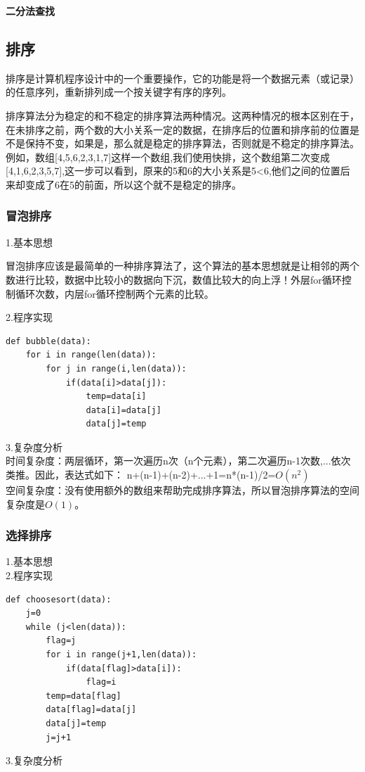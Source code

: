 \documentclass[UTF8]{ctexart}
\begin{document}
\textbf{二分法查找}
\subsection{排序}
排序是计算机程序设计中的一个重要操作，它的功能是将一个数据元素（或记录）的任意序列，重新排列成一个按关键字有序的序列。

排序算法分为稳定的和不稳定的排序算法两种情况。这两种情况的根本区别在于，在未排序之前，两个数的大小关系一定的数据，在排序后的位置和排序前的位置是不是保持不变，如果是，那么就是稳定的排序算法，否则就是不稳定的排序算法。例如，数组[4,5,6,2,3,1,7]这样一个数组,我们使用快排，这个数组第二次变成[4,1,6,2,3,5,7],这一步可以看到，原来的5和6的大小关系是5<6,他们之间的位置后来却变成了6在5的前面，所以这个就不是稳定的排序。

\subsubsection{冒泡排序}

1.基本思想

冒泡排序应该是最简单的一种排序算法了，这个算法的基本思想就是让相邻的两个数进行比较，数据中比较小的数据向下沉，数值比较大的向上浮！外层for循环控制循环次数，内层for循环控制两个元素的比较。

2.程序实现
\begin{lstlisting}
def bubble(data):
    for i in range(len(data)):
        for j in range(i,len(data)):
            if(data[i]>data[j]):
                temp=data[i]
                data[i]=data[j]
                data[j]=temp
\end{lstlisting}
3.复杂度分析\\
时间复杂度：两层循环，第一次遍历n次（n个元素），第二次遍历n-1次数,...依次类推。因此，表达式如下：
n+(n-1)+(n-2)+...+1=n*(n-1)/2=$O(n^2)$\\
空间复杂度：没有使用额外的数组来帮助完成排序算法，所以冒泡排序算法的空间复杂度是$O(1)$。
\subsubsection{选择排序}
1.基本思想\\
2.程序实现\\
\begin{lstlisting}
def choosesort(data):
    j=0
    while (j<len(data)):
        flag=j
        for i in range(j+1,len(data)):
            if(data[flag]>data[i]):
                flag=i
        temp=data[flag]
        data[flag]=data[j]
        data[j]=temp
        j=j+1
\end{lstlisting}
3.复杂度分析\\
\end{document}
